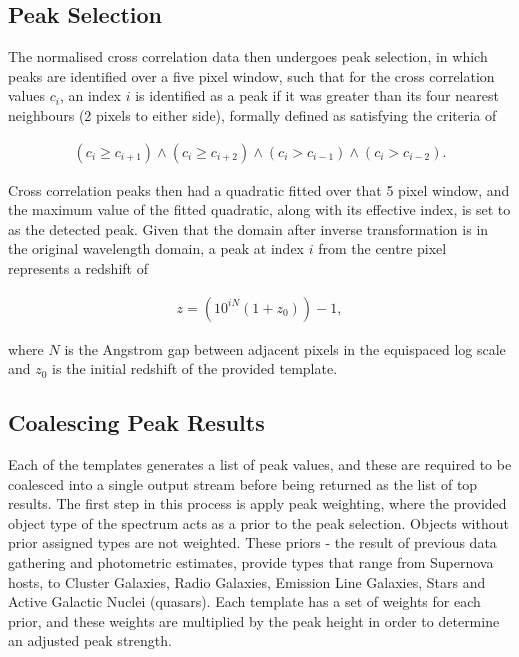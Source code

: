 \documentclass[titlesmallcaps, examinerscopy, copyrightpage]{uqthesis}
\newcommand{\brac}[1]{\left( #1 \right)}
\begin{document}
\subsection{Peak Selection}

The normalised cross correlation data then undergoes peak selection, in which peaks are identified over a five pixel window, such that for the cross correlation values $c_i$, an index $i$ is identified as a peak if it was greater than its four nearest neighbours (2 pixels to either side), formally defined as satisfying the criteria of

\begin{align}
\brac{c_i \geq c_{i+1}} \land \brac{c_i \geq c_{i+2}} \land \brac{c_i > c_{i-1}} \land \brac{c_i > c_{i-2}}.
\end{align}

Cross correlation peaks then had a quadratic fitted over that 5 pixel window, and the maximum value of the fitted quadratic, along with its effective index, is set to as the detected peak. Given that the domain after inverse transformation is in the original wavelength domain, a peak at index $i$ from the centre pixel represents a redshift of 

\begin{align}
z = \brac{10^{iN} (1+z_0)} - 1,
\end{align}

where $N$ is the Angstrom gap between adjacent pixels in the equispaced log scale and $z_0$ is the initial redshift of the provided template.

\subsection{Coalescing Peak Results}

Each of the templates generates a list of peak values, and these are required to be coalesced into a single output stream before being returned as the list of top results. The first step in this process is apply peak weighting, where the provided object type of the spectrum acts as a prior to the peak selection. Objects without prior assigned types are not weighted. These priors - the result of previous data gathering and photometric estimates, provide types that range from Supernova hosts, to Cluster Galaxies, Radio Galaxies, Emission Line Galaxies, Stars and Active Galactic Nuclei (quasars). Each template has a set of weights for each prior, and these weights are multiplied by the peak height in order to determine an adjusted peak strength.
\end{document}
